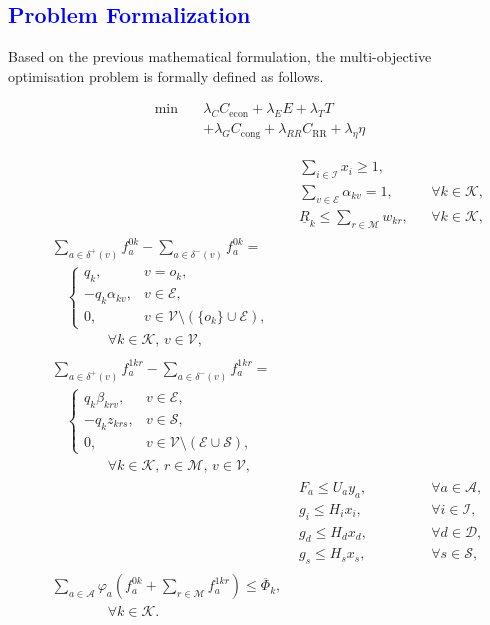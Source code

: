 \documentclass[a4paper,fleqn]{cas-dc}
\newcommand{\V}{\mathcal{V}}
\newcommand{\A}{\mathcal{A}}
\newcommand{\Iset}{\mathcal{I}}
\newcommand{\Dset}{\mathcal{D}}
\newcommand{\Eset}{\mathcal{E}}
\newcommand{\Sset}{\mathcal{S}}
\newcommand{\Kset}{\mathcal{K}}
\newcommand{\Mset}{\mathcal{M}}
\begin{document}
\subsection{\textcolor{blue}{Problem Formalization}}


Based on the previous mathematical formulation, the multi-objective optimisation problem is formally defined as follows.


\begin{equation}
\begin{split}
\min \quad & \lambda_C C_{\mathrm{econ}} + \lambda_E E + \lambda_T T \\
& + \lambda_G C_{\mathrm{cong}} + \lambda_{RR} C_{\mathrm{RR}} + \lambda_{\eta} \eta
\end{split}
\end{equation}

\begin{align}
& \sum_{i\in\Iset} x_i \ge 1, \\[2ex]
& \sum_{v\in\Eset} \alpha_{kv} = 1, && \forall k \in \Kset, \\[2ex]
& \underline R_k \le \sum_{r\in\Mset} w_{kr}, && \forall k \in \Kset, \\[2ex]
\begin{split}
  & \sum_{a\in\delta^{+}(v)} f_a^{0k} - \sum_{a\in\delta^{-}(v)} f_a^{0k} = \\
  &\quad \begin{cases}
    q_k, & v = o_k, \\
    -q_k \alpha_{kv}, & v \in \Eset, \\
    0, & v \in \V\setminus(\{o_k\} \cup \Eset),
  \end{cases} \\
  &\qquad\qquad \forall k \in \Kset, \, v \in \V,
\end{split} \\[2ex]
\begin{split}
  & \sum_{a\in\delta^{+}(v)} f_a^{1kr} - \sum_{a\in\delta^{-}(v)} f_a^{1kr} = \\
  &\quad \begin{cases}
    q_k \beta_{krv}, & v \in \Eset, \\
    -q_k z_{krs}, & v \in \Sset, \\
    0, & v \in \V\setminus(\Eset \cup \Sset),
  \end{cases} \\
  &\qquad\qquad \forall k \in \Kset, \, r \in \Mset, \, v \in \V,
\end{split} \\[2ex]
& F_a \le U_a y_a, && \forall a \in \A, \\[2ex]
& g_i \le H_i x_i, && \forall i \in \Iset, \\[2ex]
& g_d \le H_d x_d, && \forall d \in \Dset, \\[2ex]
& g_s \le H_s x_s, && \forall s \in \Sset, \\[2ex]
\begin{split}
  & \sum_{a\in\A} \varphi_a \left(f_a^{0k} + \sum_{r\in\Mset} f_a^{1kr}\right) \le \overline\Phi_k, \\
  &\qquad\qquad \forall k \in \Kset.
\end{split}
\end{align}
\end{document}
